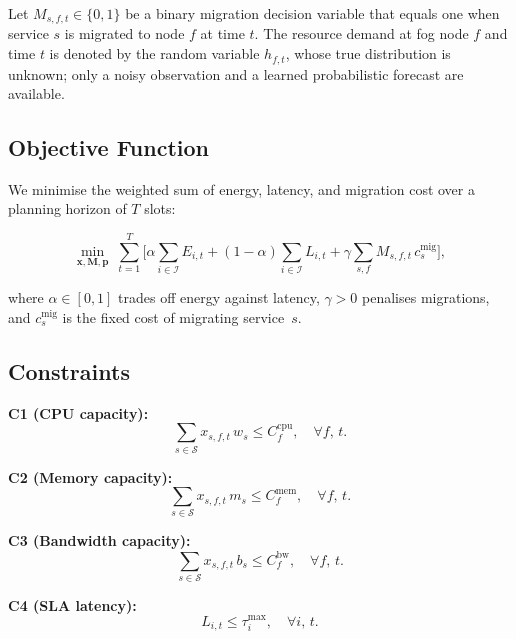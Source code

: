 \documentclass[conference]{IEEEtran}
\newcommand{\I}{\mathcal{I}}
\newcommand{\Set}[1]{\mathcal{#1}}
\begin{document}
Let $M_{s,f,t} \in \{0,1\}$ be a binary migration decision variable
that equals one when service $s$ is migrated to node $f$ at time $t$.
The resource demand at fog node $f$ and time $t$ is denoted by the
random variable $h_{f,t}$, whose true distribution is unknown; only a
noisy observation and a learned probabilistic forecast are available.

\subsection{Objective Function}

We minimise the weighted sum of energy, latency, and migration cost
over a planning horizon of $T$ slots:

\begin{equation}
\min_{\mathbf{x},\mathbf{M},\mathbf{p}}\;
  \sum_{t=1}^{T}\!\Bigg[
    \alpha \!\sum_{i \in \I}\! E_{i,t}
    + (1-\alpha)\! \sum_{i \in \I}\! L_{i,t}
    + \gamma \!\sum_{s,f}\! M_{s,f,t}\,c_s^{\mathrm{mig}}
  \Bigg],
\label{eq:objective}
\end{equation}

where $\alpha \in [0,1]$ trades off energy against latency,
$\gamma > 0$ penalises migrations, and $c_s^{\mathrm{mig}}$ is the
fixed cost of migrating service~$s$.

\subsection{Constraints}

\noindent\textbf{C1 (CPU capacity):}
\begin{equation}
  \sum_{s \in \Set{S}} x_{s,f,t}\,w_s \leq C_f^{\mathrm{cpu}},
  \quad \forall f,\, t.
\end{equation}

\noindent\textbf{C2 (Memory capacity):}
\begin{equation}
  \sum_{s \in \Set{S}} x_{s,f,t}\,m_s \leq C_f^{\mathrm{mem}},
  \quad \forall f,\, t.
\end{equation}

\noindent\textbf{C3 (Bandwidth capacity):}
\begin{equation}
  \sum_{s \in \Set{S}} x_{s,f,t}\,b_s \leq C_f^{\mathrm{bw}},
  \quad \forall f,\, t.
\end{equation}

\noindent\textbf{C4 (SLA latency):}
\begin{equation}
  L_{i,t} \leq \tau_i^{\max}, \quad \forall i,\, t.
\end{equation}
\end{document}
